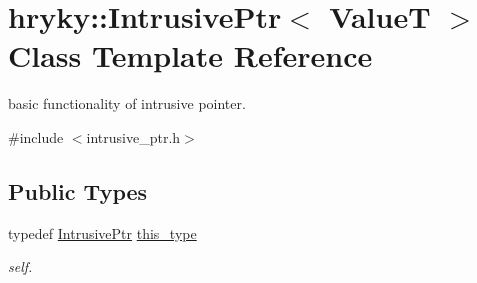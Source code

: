 \hypertarget{classhryky_1_1_intrusive_ptr}{\section{hryky\-:\-:Intrusive\-Ptr$<$ Value\-T $>$ Class Template Reference}
\label{classhryky_1_1_intrusive_ptr}
}


basic functionality of intrusive pointer.  




{\ttfamily \#include $<$intrusive\-\_\-ptr.\-h$>$}

\subsection*{Public Types}
\begin{DoxyCompactItemize}
\item 
\hypertarget{classhryky_1_1_intrusive_ptr_a0fb00a7eafa8939e21653f677d1b2989}{typedef \hyperlink{classhryky_1_1_intrusive_ptr}{Intrusive\-Ptr} \hyperlink{classhryky_1_1_intrusive_ptr_a0fb00a7eafa8939e21653f677d1b2989}{this\-\_\-type}}\label{classhryky_1_1_intrusive_ptr_a0fb00a7eafa8939e21653f677d1b2989}

\begin{DoxyCompactList}\small\item\em self. \end{DoxyCompactList}\end{DoxyCompactItemize}
